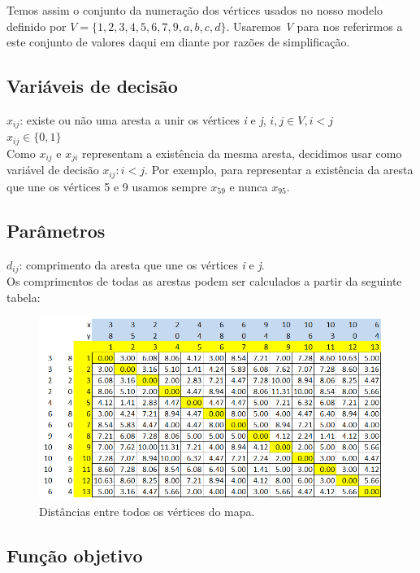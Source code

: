 \documentclass{article}
\begin{document}
Temos assim o conjunto da numeração dos vértices usados no nosso modelo definido por $ V = \{1,2,3,4,5,6,7,9,a,b,c,d\} $. Usaremos \emph{V} para nos referirmos a este conjunto de valores daqui em diante por razões de simplificação.

\subsection{Variáveis de decisão}

\(x_{ij}\): existe ou não uma aresta a unir os vértices \emph{i} e \emph{j}, $ i, j \in V, i < j $\\
\(x_{ij} \in \{ 0,1 \}\)\\

\noindent Como $ x_{ij} $ e $ x_{ji} $ representam a existência da mesma aresta, decidimos usar como variável de decisão $ x_{ij}: i < j $. Por exemplo, para representar a existência da aresta que une os vértices 5 e 9 usamos sempre $ x_{59} $ e nunca $ x_{95} $.

\subsection{Parâmetros}

$ d_{ij} $: comprimento da aresta que une os vértices \emph{i} e \emph{j}.\\
Os comprimentos de todas as arestas podem ser calculados a partir da seguinte tabela:

\begin{figure}[H]
    \centering
    \includegraphics[width=0.8\linewidth]{fig3.png}
    \caption{Distâncias entre todos os vértices do mapa.}
    \label{dists}
\end{figure}

\subsection{Função objetivo}
\end{document}
